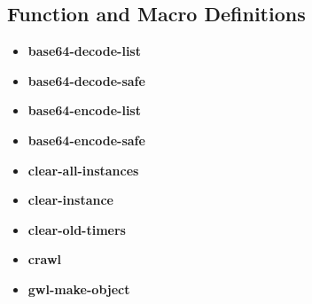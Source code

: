\documentclass [11pt]{book}
\begin{document}
\subsection{Function and Macro Definitions}

\label{subsec:functionandmacrodefinitions}



\begin{itemize}

\item {}
\label{prim:base64-decode-list}
\textbf{base64-decode-list}





\item {}
\label{prim:base64-decode-safe}
\textbf{base64-decode-safe}





\item {}
\label{prim:base64-encode-list}
\textbf{base64-encode-list}





\item {}
\label{prim:base64-encode-safe}
\textbf{base64-encode-safe}





\item {}
\label{prim:clear-all-instances}
\textbf{clear-all-instances}





\item {}
\label{prim:clear-instance}
\textbf{clear-instance}





\item {}
\label{prim:clear-old-timers}
\textbf{clear-old-timers}





\item {}
\label{prim:crawl}
\textbf{crawl}





\item {}
\label{prim:gwl-make-object}
\textbf{gwl-make-object}






\end{itemize}
\end{document}
